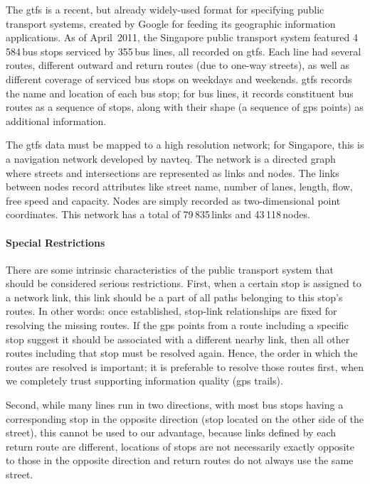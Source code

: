The \gls{gtfs} is a recent, but already widely-used format for specifying public transport systems, created by Google for feeding its geographic information applications. As of April~2011, the Singapore public transport system featured 4\,584\,bus stops serviced by 355\,bus lines, all recorded on \gls{gtfs}. Each line had several routes, \ie different outward and return routes (due to one-way streets), as well as different coverage of serviced bus stops on weekdays and weekends. \gls{gtfs} records the name and location of each bus stop; for bus lines, it records constituent bus routes as a sequence of stops, along with their shape (a sequence of \gls{gps} points) as additional information. 

The \gls{gtfs} data must be mapped to a high resolution network; for Singapore, this is a navigation network developed by \gls{navteq}. The network is a directed graph where streets and intersections are represented as links and nodes. The links between nodes record attributes like street name, number of lanes, length, flow, free speed and capacity. Nodes are simply recorded as two-dimensional point coordinates. This network has a total of 79\,835\,links and 43\,118\,nodes.

\paragraph{Special Restrictions}

There are some intrinsic characteristics of the public transport system that should be considered serious restrictions. First, when a certain stop is assigned to a network link, this link should be a part of all paths belonging to this stop's routes. In other words: once established, stop-link relationships are fixed for resolving the missing routes. If the \gls{gps} points from a route including a specific stop suggest it should be associated with a different nearby link, then all other routes including that stop must be resolved again. Hence, the order in which the routes are resolved is important; it is preferable to resolve those routes first, when we completely trust supporting information quality (\eg \gls{gps} trails).

Second, while many lines run in two directions, with most bus stops having a corresponding stop in the opposite direction (stop located on the other side of the street), this cannot be used to our advantage, because links defined by each return route are different, locations of stops are not necessarily exactly opposite to those in the opposite direction and return routes do not always use the same street.

